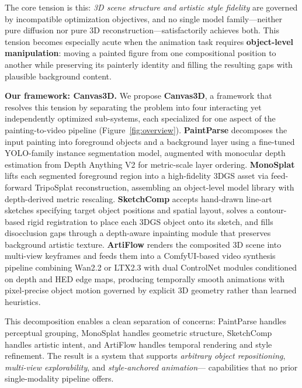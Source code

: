 The core tension is this: \textit{3D scene structure and artistic style
fidelity} are governed by incompatible optimization objectives, and no single
model family---neither pure diffusion nor pure 3D reconstruction---satisfactorily
achieves both. This tension becomes especially acute when the animation task
requires \textbf{object-level manipulation}: moving a painted figure from one
compositional position to another while preserving its painterly identity and
filling the resulting gaps with plausible background content.

\smallskip
\noindent\textbf{Our framework: Canvas3D.}
We propose \textbf{Canvas3D}, a framework that resolves this tension by
separating the problem into four interacting yet independently optimized
sub-systems, each specialized for one aspect of the painting-to-video
pipeline (Figure~\ref{fig:overview}). \textbf{PaintParse} decomposes the input
painting into foreground objects and a background layer using a fine-tuned
YOLO-family instance segmentation model, augmented with monocular depth
estimation from Depth Anything V2 for metric-scale layer ordering.
\textbf{MonoSplat} lifts each segmented foreground region into a high-fidelity
3DGS asset via feed-forward TripoSplat reconstruction, assembling an
object-level model library with depth-derived metric rescaling.
\textbf{SketchComp} accepts hand-drawn line-art sketches specifying target
object positions and spatial layout, solves a contour-based rigid registration
to place each 3DGS object onto its sketch, and fills disocclusion gaps through a
depth-aware inpainting module that preserves background artistic texture.
\textbf{ArtiFlow} renders the composited 3D scene into multi-view keyframes and
feeds them into a ComfyUI-based video synthesis pipeline combining Wan2.2 or
LTX2.3 with dual ControlNet modules conditioned on depth and HED edge maps,
producing temporally smooth animations with pixel-precise object motion governed
by explicit 3D geometry rather than learned heuristics.

This decomposition enables a clean separation of concerns: PaintParse handles
perceptual grouping, MonoSplat handles geometric structure, SketchComp handles
artistic intent, and ArtiFlow handles temporal rendering and style refinement.
The result is a system that supports \textit{arbitrary object repositioning},
\textit{multi-view explorability}, and \textit{style-anchored animation}---
capabilities that no prior single-modality pipeline offers.

